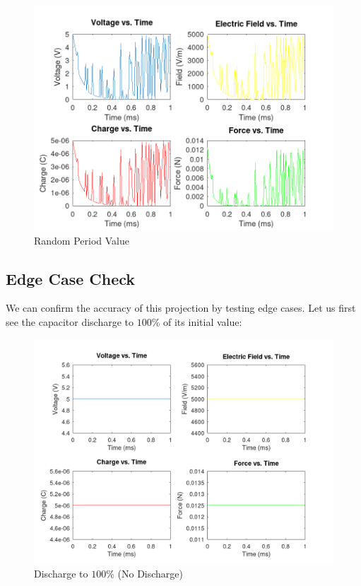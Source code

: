 \begin{figure}[H]
  \centering
  \includegraphics[width=.9\textwidth]{Figures/RandT.png}
  \caption{Random Period Value}
  \label{fig:4}
\end{figure}

\subsection{Edge Case Check}

We can confirm the accuracy of this projection by testing edge cases. Let us first see the capacitor discharge to $100\%$ of its initial value:

\begin{center}
  \begin{figure}[H]
    \centering
    \includegraphics[width=.9\textwidth]{Figures/NoDischarge.png}
    \caption{Discharge to $100\%$ (No Discharge)}
    \label{fig:4}
  \end{figure}
\end{center}

